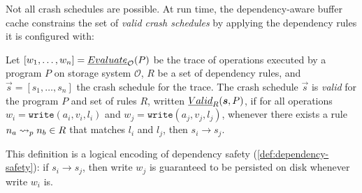 Not all crash schedules are possible.
At run time, the dependency-aware buffer cache
constrains the set of \emph{valid crash schedules}
by applying the dependency rules it is configured with:

\begin{definition}\label{def:valid-schedule}
Let $[w_1, \dots, w_n] = \evaluate{P}{\mathcal{O}}$
be the trace of operations executed by a program $P$ on storage system $\mathcal{O}$,
$R$ be a set of dependency rules,
and $\vec{s} = [s_1, \dots, s_n]$
the crash schedule for the trace.
The crash schedule $\vec{s}$ is \emph{valid} for the program $P$
and set of rules $R$,
written $\valid{\vec{s}}{P}{R}$,
if for all operations $w_i = \texttt{write}(a_i, v_i, l_i)$
and $w_j = \texttt{write}(a_j, v_j, l_j)$,
whenever there exists a rule $\deprule{n_a}{n_b}{p} \in R$ that matches $l_i$ and $l_j$,
then $s_i \rightarrow s_j$.
\end{definition}
%
\noindent
This definition is a logical encoding of dependency safety (\cref{def:dependency-safety}):
if $s_i \rightarrow s_j$,
then write $w_j$ is guaranteed to be persisted on disk
whenever write $w_i$ is.


